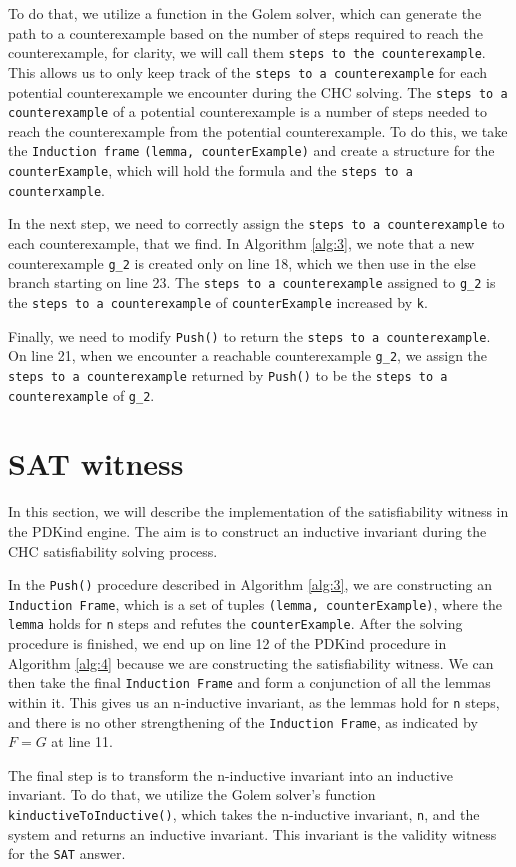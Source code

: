 To do that, we utilize a function in the Golem solver, which can generate the
path to a counterexample based on the number of steps required to reach the
counterexample, for clarity, we will call them \texttt{steps to the
counterexample}. This allows us to only keep track of the \texttt{steps to a
counterexample} for each potential counterexample we encounter during the CHC
solving. The \texttt{steps to a counterexample} of a potential counterexample
is a number of steps needed to reach the counterexample from the potential
counterexample. To do this, we take the \texttt{Induction frame}
\texttt{(lemma, counterExample)} and create a structure for the
\texttt{counterExample}, which will hold the formula and the \texttt{steps to a
counterxample}.

In the next step, we need to correctly assign the \texttt{steps to a
counterexample} to each counterexample, that we find. In Algorithm
\ref{alg:3}, we note that a new counterexample
\texttt{g\_2} is created only on line 18, which we then use in the else branch
starting on line 23. The \texttt{steps to a counterexample} assigned to
\texttt{g\_2} is the \texttt{steps to a counterexample} of
\texttt{counterExample} increased by \texttt{k}.

Finally, we need to modify \texttt{Push()} to return the \texttt{steps to a
counterexample}. On line 21, when we encounter a reachable counterexample
\texttt{g\_2}, we assign the \texttt{steps to a counterexample} returned by
\texttt{Push()} to be the \texttt{steps to a counterexample} of \texttt{g\_2}.

\section*{SAT witness}
\noindent In this section, we will describe the implementation of the
satisfiability witness in the PDKind engine. The aim is to construct an
inductive invariant during the CHC satisfiability solving process.

In the \texttt{Push()} procedure described in Algorithm
\ref{alg:3}, we are constructing an \texttt{Induction
Frame}, which is a set of tuples \texttt{(lemma, counterExample)}, where the
\texttt{lemma} holds for \texttt{n} steps and refutes the
\texttt{counterExample}. After the solving procedure is finished, we end up on
line 12 of the PDKind procedure in Algorithm \ref{alg:4}
because we are constructing the satisfiability
witness. We can then take the final \texttt{Induction Frame} and form a
conjunction of all the lemmas within it. This gives us an n-inductive
invariant, as the lemmas hold for \texttt{n} steps, and there is no other
strengthening of the \texttt{Induction Frame}, as indicated by \( F = G \) at
line 11.

The final step is to transform the n-inductive invariant into an inductive
invariant. To do that, we utilize the Golem solver's function
\texttt{kinductiveToInductive()}, which takes the n-inductive invariant,
\texttt{n}, and the system and returns an inductive invariant. This invariant
is the validity witness for the \texttt{SAT} answer.

